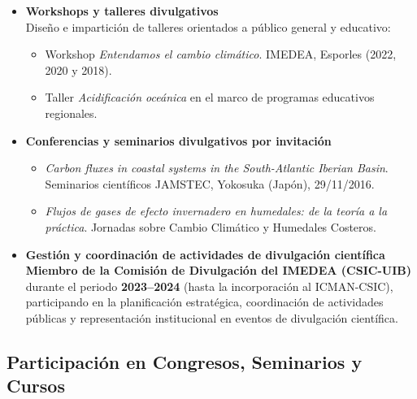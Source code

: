 \documentclass[11pt,a4paper]{article}
\begin{document}
\begin{itemize}[leftmargin=*]
    \item \textbf{Workshops y talleres divulgativos}\\
    Diseño e impartición de talleres orientados a público general y educativo:
    \begin{itemize}
        \item Workshop \textit{Entendamos el cambio climático}. IMEDEA, Esporles (2022, 2020 y 2018).
        \item Taller \textit{Acidificación oceánica} en el marco de programas educativos regionales.
    \end{itemize}

    \item \textbf{Conferencias y seminarios divulgativos por invitación}\\
    \begin{itemize}
        \item \textit{Carbon fluxes in coastal systems in the South-Atlantic Iberian Basin}. Seminarios científicos JAMSTEC, Yokosuka (Japón), 29/11/2016.
        \item \textit{Flujos de gases de efecto invernadero en humedales: de la teoría a la práctica}. Jornadas sobre Cambio Climático y Humedales Costeros.
    \end{itemize}

    \item \textbf{Gestión y coordinación de actividades de divulgación científica}\\
    \textbf{Miembro de la Comisión de Divulgación del IMEDEA (CSIC-UIB)} durante el periodo \textbf{2023--2024} (hasta la incorporación al ICMAN-CSIC), participando en la planificación estratégica, coordinación de actividades públicas y representación institucional en eventos de divulgación científica.

\end{itemize}

\subsection{Participación en Congresos, Seminarios y Cursos}
\end{document}
